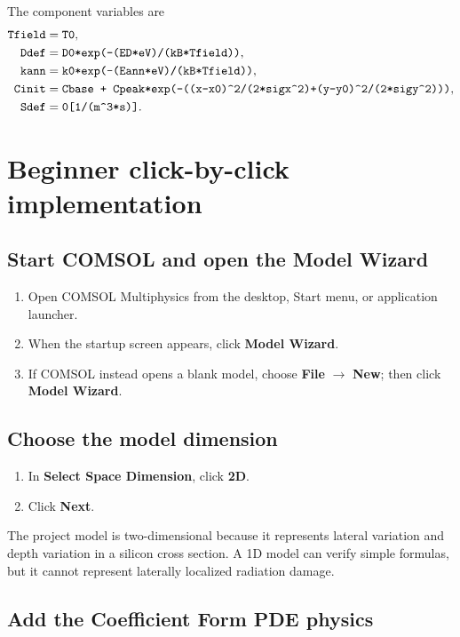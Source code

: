 \documentclass[11pt]{article}
\newcommand{\COMSOL}{COMSOL Multiphysics}
\newcommand{\code}[1]{\texttt{\detokenize{#1}}}
\begin{document}
The component variables are
\begin{align}
\code{Tfield} &= \code{T0},\\
\code{Ddef} &= \code{D0*exp(-(ED*eV)/(kB*Tfield))},\\
\code{kann} &= \code{k0*exp(-(Eann*eV)/(kB*Tfield))},\\
\code{Cinit} &= \code{Cbase + Cpeak*exp(-((x-x0)^2/(2*sigx^2)+(y-y0)^2/(2*sigy^2)))},\\
\code{Sdef} &= \code{0[1/(m^3*s)]}.
\end{align}

\section{Beginner click-by-click implementation}

\subsection{Start COMSOL and open the Model Wizard}

\begin{enumerate}[leftmargin=2em]
\item Open \COMSOL{} from the desktop, Start menu, or application launcher.
\item When the startup screen appears, click \textbf{Model Wizard}.
\item If COMSOL instead opens a blank model, choose \textbf{File} $\rightarrow$ \textbf{New}; then click \textbf{Model Wizard}.
\end{enumerate}

\subsection{Choose the model dimension}

\begin{enumerate}[leftmargin=2em]
\item In \textbf{Select Space Dimension}, click \textbf{2D}.
\item Click \textbf{Next}.
\end{enumerate}

The project model is two-dimensional because it represents lateral variation and depth variation in a silicon cross section. A 1D model can verify simple formulas, but it cannot represent laterally localized radiation damage.

\subsection{Add the Coefficient Form PDE physics}
\end{document}

